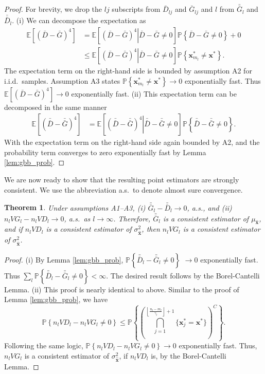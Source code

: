 \documentclass[12pt]{article}
\newtheorem{theorem}{Theorem}
\newcommand{\p}[1]{\mathbb{P} \left\{ #1 \right\}}
\newcommand{\e}[1]{\mathbb{E} \left[ #1 \right]
}
\newcommand{\x}{\mathbf{x}}
\newcommand{\xh}{{\hat{\x}}}
\newcommand{\xs}{\x^*}
\newcommand{\nbl}{\left\lfloor\tfrac{n_l-m_l}{\gamma_l}\right\rfloor+1}
\newcommand{\gb}{\bar{G}}
\newcommand{\gbb}{\bar{\gb}}
\newcommand{\db}{\bar{D}}
\newcommand{\dbb}{\bar{\db}}
\begin{document}
\begin{proof}
	For brevity, we drop the $lj$ subscripts from $\db_{lj}$ and $\gb_{lj}$ and $l$ from $\gbb_l$ and $\dbb_l$.
	(i) We can decompose the expectation as
	\begin{align*}
		\e{(\db - \gb)^4} & = \e{ \left.(\db - \gb)^4 \right| \db - \gb \neq 0} \p{\db - \gb \neq 0} + 0\\
		& \leq \e{ \left.(\db - \gb)^4 \right| \db - \gb \neq 0} \p{ \xs_{m_l}  \neq \xs}.
	\end{align*}
	The expectation term on the right-hand side is bounded by assumption A2 for i.i.d.\ samples.  
        Assumption A3 states $\p{\xs_{m_l} \neq \xs} \rightarrow 0$ exponentially fast.  
        Thus $\e{(\db - \gb)^4} \rightarrow 0$ exponentially fast.
(ii) This expectation term can be decomposed in the same manner
	\begin{align*}
		\e{(\dbb - \gbb)^4} & = \e{\left. (\dbb - \gbb)^4 \right| \dbb - \gbb \neq 0} \p{\dbb - \gbb \neq 0}.
	\end{align*}
	With the expectation term on the right-hand side again bounded by A2, and the probability term converges to zero exponentially fast by Lemma \ref{lem:gbb_prob}.
\end{proof}

We are now ready to show that the resulting point estimators are strongly consistent. 
We use the abbreviation a.s.\ to denote almost sure convergence. 
 

\begin{theorem} \label{thm:strong_consistency}
	Under assumptions A1--A3, (i) $\gbb_l - \dbb_l \rightarrow 0$, a.s., and (ii) $n_l VG_l - n_l VD_l \rightarrow 0$, a.s.\ as $l \rightarrow \infty$.  
        Therefore, $\gbb_l$ is a consistent estimator of $\mu_{\xh}$, and if $n_l VD_l$ is a consistent estimator of $\sigma^2_{\xh}$, then $n_l VG_l$ is a consistent estimator of $\sigma^2_{\xh}$.
\end{theorem}

\begin{proof}
	(i) By Lemma \ref{lem:gbb_prob}, $\p{\dbb_l - \gbb_l \neq 0}$ $\rightarrow 0$ exponentially fast.  
        Thus $\sum_l \p{\dbb_l - \gbb_l \neq 0} < \infty$.  
        The desired result follows by the Borel-Cantelli Lemma.
%
(ii) This proof is nearly identical to above. 
Similar to the proof of Lemma \ref{lem:gbb_prob}, we have
	\[
		\p{n_l VD_l -n_l VG_l \neq 0} \leq \p{\left( \bigcap_{j=1}^{\nbl} \{\xs_{j} = \xs\} \right)^C}.
	\]
	Following the same logic, $\p{n_l VD_l -n_l VG_l \neq 0} \rightarrow 0$ exponentially fast. 
Thus, $n_l VG_l$ is a consistent estimator of $\sigma^2_{\xh}$, if $n_l VD_l$ is, by the Borel-Cantelli Lemma.
\end{proof}
\end{document}
